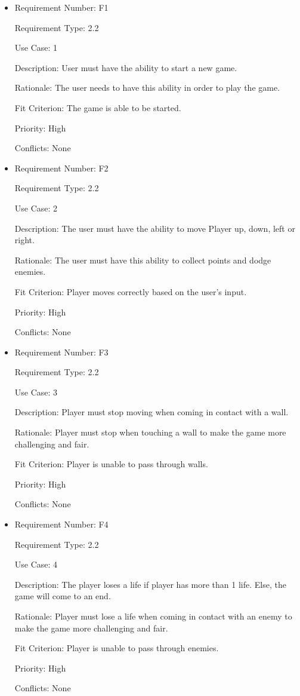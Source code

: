 \documentclass[12pt, titlepage]{article}
\begin{document}
\begin{itemize}
\item
Requirement Number: F1

Requirement Type: 2.2

Use Case: 1

Description: User must have the ability to start a new game.

Rationale: The user needs to have this ability in order to play the game.

Fit Criterion: The game is able to be started.

Priority: High

Conflicts: None
\end{itemize}

\begin{itemize}
\item
Requirement Number: F2

Requirement Type: 2.2

Use Case: 2

Description: The user must have the ability to move Player up, down, left or right.

Rationale: The user must have this ability to collect points and dodge enemies.

Fit Criterion: Player moves correctly based on the user’s input.

Priority: High

Conflicts: None
\end{itemize}

\begin{itemize}
\item
Requirement Number: F3 

Requirement Type: 2.2

Use Case: 3

Description: Player must stop moving when coming in contact with a wall.

Rationale: Player must stop when touching a wall to make the game more challenging and fair.

Fit Criterion: Player is unable to pass through walls.

Priority: High

Conflicts: None
\end{itemize}

\begin{itemize}
\item
Requirement Number: F4

Requirement Type: 2.2

Use Case: 4

Description: The player loses a life if player has more than 1 life. Else, the game will come to an end.

Rationale: Player must lose a life when coming in contact with an enemy to make the game more challenging and fair.

Fit Criterion: Player is unable to pass through enemies.

Priority: High

Conflicts: None
\end{itemize}
\end{document}
